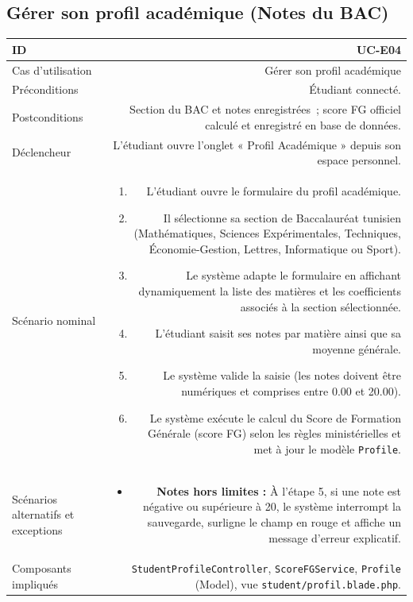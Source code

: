 \vspace{1.5em}

\subsection{Gérer son profil académique (Notes du BAC)}

\noindent
{}
\begin{tabularx}{\linewidth}{|L|R|}
\hline
{}ID & UC-E04 \\
\hline
Cas d'utilisation & Gérer son profil académique \\
\hline
{}Préconditions & Étudiant connecté. \\
\hline
Postconditions & Section du BAC et notes enregistrées~; score FG officiel calculé et enregistré en base de données. \\
\hline
{}Déclencheur & L'étudiant ouvre l'onglet « Profil Académique » depuis son espace personnel. \\
\hline
Scénario nominal &
\begin{enumerate}[nosep,leftmargin=*]
  \item L'étudiant ouvre le formulaire du profil académique.
  \item Il sélectionne sa section de Baccalauréat tunisien (Mathématiques, Sciences Expérimentales, Techniques, Économie-Gestion, Lettres, Informatique ou Sport).
  \item Le système adapte le formulaire en affichant dynamiquement la liste des matières et les coefficients associés à la section sélectionnée.
  \item L'étudiant saisit ses notes par matière ainsi que sa moyenne générale.
  \item Le système valide la saisie (les notes doivent être numériques et comprises entre 0.00 et 20.00).
  \item Le système exécute le calcul du Score de Formation Générale (score FG) selon les règles ministérielles et met à jour le modèle \texttt{Profile}.
\end{enumerate} \\
\hline
{}Scénarios alternatifs et exceptions &
\begin{itemize}[nosep,leftmargin=*]
  \item \textbf{Notes hors limites :} À l'étape 5, si une note est négative ou supérieure à 20, le système interrompt la sauvegarde, surligne le champ en rouge et affiche un message d'erreur explicatif.
\end{itemize} \\
\hline
Composants impliqués & \texttt{StudentProfileController}, \texttt{ScoreFGService}, \texttt{Profile} (Model), vue \texttt{student/profil.blade.php}. \\
\hline
\end{tabularx}

